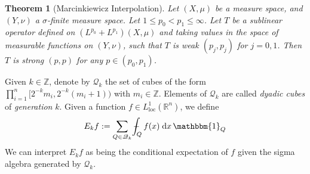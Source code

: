\documentclass{book}
\newcommand{\scrQ}{\mathscr{Q}}
\newcommand{\bbR}{\mathbb{R}}
\newcommand{\bbZ}{\mathbb{Z}}
\newcommand{\bbone}{\mathbbm{1}}
\renewcommand{\d}{\mathrm{d}}
\def\Xint#1{\mathchoice
{\XXint\displaystyle\textstyle{#1}}%
{\XXint\textstyle\scriptstyle{#1}}%
{\XXint\scriptstyle\scriptscriptstyle{#1}}%
{\XXint\scriptscriptstyle\scriptscriptstyle{#1}}%
\!\int}
\def\XXint#1#2#3{{\setbox0=\hbox{$#1{#2#3}{\int}$ }
\vcenter{\hbox{$#2#3$ }}\kern-.6\wd0}}
\def\dashint{\Xint-}
\newtheorem{theorem}{Theorem}[chapter]
\theoremstyle{definition}
\theoremstyle{remark}
\numberwithin{equation}{chapter}
\begin{document}
\begin{theorem}[Marcinkiewicz Interpolation]
    Let $(X,\mu)$ be a measure space, and $(Y,\nu)$ a $\sigma$-finite measure space. Let $1 \leq p_0 < p_1 \leq \infty$. Let $T$ be a sublinear operator defined on $(L^{p_0} + L^{p_1})(X,\mu)$ and taking values in the space of measurable functions on $(Y,\nu)$, such that $T$ is weak $(p_j,p_j)$ for $j = 0,1$. Then $T$ is strong $(p,p)$ for any $p \in (p_0,p_1)$.
\end{theorem}

Given $k \in \bbZ$, denote by $\scrQ_k$ the set of cubes of the form $\prod_{i=1}^n [2^{-k}m_i, 2^{-k}(m_i + 1))$ with $m_i \in \bbZ$. Elements of $\scrQ_k$ are called \textit{dyadic cubes} of \textit{generation} $k$. Given a function $f \in L^1_\text{loc}(\bbR^n)$, we define
\begin{equation}
    E_k f := \sum_{Q \in \scrQ_k} \dashint_Q f(x) \; \d x \, \bbone_Q
\end{equation}
We can interpret $E_k f$ as being the conditional expectation of $f$ given the sigma algebra generated by $\scrQ_k$.
\end{document}
